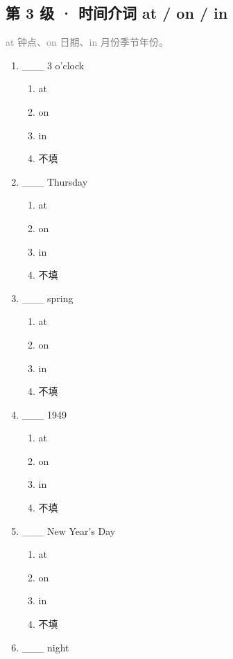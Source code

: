\documentclass[11pt,a4paper]{ctexart}
\begin{document}
\subsection*{第 3 级 · 时间介词 at / on / in}
\noindent\textcolor{gray}{at 钟点、on 日期、in 月份季节年份。}\par\smallskip
\begin{enumerate}[leftmargin=*,itemsep=4pt]
\item \_\_\_ 3 o’clock
\begin{enumerate}[label=\Alph*.,leftmargin=2em,itemsep=1pt,topsep=2pt]
\item at
\item on
\item in
\item 不填
\end{enumerate}
\item \_\_\_ Thursday
\begin{enumerate}[label=\Alph*.,leftmargin=2em,itemsep=1pt,topsep=2pt]
\item at
\item on
\item in
\item 不填
\end{enumerate}
\item \_\_\_ spring
\begin{enumerate}[label=\Alph*.,leftmargin=2em,itemsep=1pt,topsep=2pt]
\item at
\item on
\item in
\item 不填
\end{enumerate}
\item \_\_\_ 1949
\begin{enumerate}[label=\Alph*.,leftmargin=2em,itemsep=1pt,topsep=2pt]
\item at
\item on
\item in
\item 不填
\end{enumerate}
\item \_\_\_ New Year’s Day
\begin{enumerate}[label=\Alph*.,leftmargin=2em,itemsep=1pt,topsep=2pt]
\item at
\item on
\item in
\item 不填
\end{enumerate}
\item \_\_\_ night

\end{enumerate}
\end{document}
